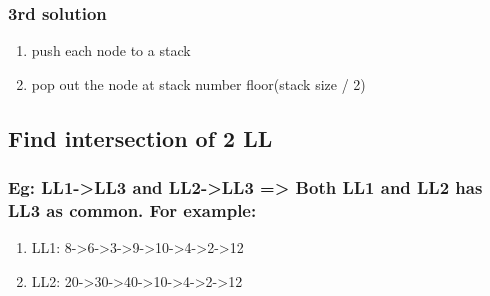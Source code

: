 \documentclass[11pt]{article}
\begin{document}
\subsubsection{3rd solution}
\label{sec:org5e3de2e}
\begin{enumerate}
\item push each node to a stack
\label{sec:org2aa645a}
\item pop out the node at stack number floor(stack size / 2)
\label{sec:org1e47d16}
\end{enumerate}
\subsection{Find intersection of 2 LL}
\label{sec:org4b0ac86}
\subsubsection{Eg: LL1->LL3 and LL2->LL3 => Both LL1 and LL2 has LL3 as common. For example:}
\label{sec:org2de5f6f}
\begin{enumerate}
\item LL1: 8->6->3->9->10->4->2->12
\label{sec:org8bc06fc}
\item LL2: 20->30->40->10->4->2->12
\label{sec:orgfc82715}
\end{enumerate}
\end{document}
